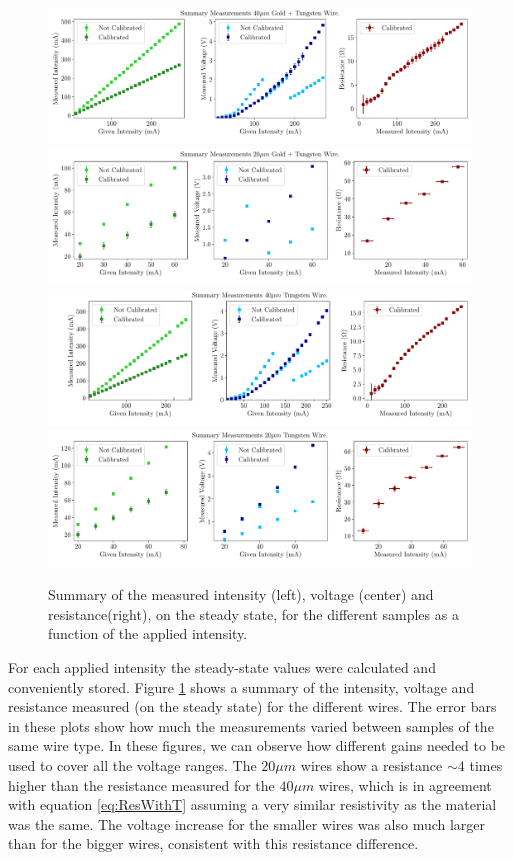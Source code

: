 \begin{figure}[h!]
    \centering
    \includegraphics[width=1.0\columnwidth]{Figure_MeasuredValues_IVR/40AuW.pdf}
    \includegraphics[width=1.0\columnwidth]{Figure_MeasuredValues_IVR/20AuW.pdf}
    \includegraphics[width=1.0\columnwidth]{Figure_MeasuredValues_IVR/40W.pdf}
    \includegraphics[width=1.0\columnwidth]{Figure_MeasuredValues_IVR/20W.pdf}
    \caption{Summary of the measured intensity (left), voltage (center) and resistance(right), on the steady state, for the different samples as a function of the applied intensity. }
    \label{fig:SummarySteadyState}
\end{figure}

For each applied intensity the steady-state values were calculated and conveniently stored. Figure \ref{fig:SummarySteadyState} shows a summary of the intensity, voltage and resistance measured (on the steady state) for the different wires. The error bars in these plots show how much the measurements varied between samples of the same wire type. In these figures, we can observe how different gains needed to be used to cover all the voltage ranges. The $20 \mu m$ wires show a resistance $\sim 4$ times higher than the resistance measured for the $40 \mu m$ wires, which is in agreement with equation \ref{eq:ResWithT} assuming a very similar resistivity as the material was the same. The voltage increase for the smaller wires was also much larger than for the bigger wires, consistent with this resistance difference. 

